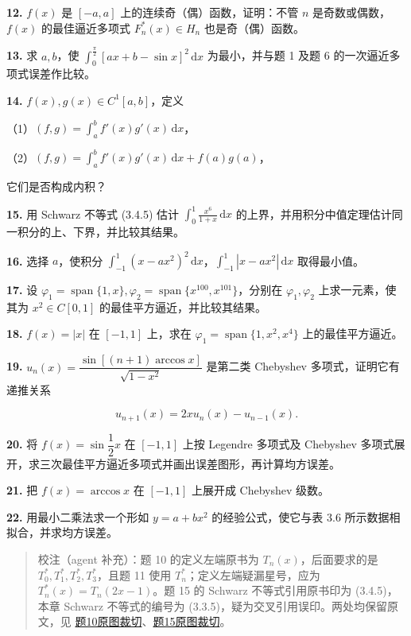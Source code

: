 \textbf{12.} \(f(x)\) 是 \([-a,a]\) 上的连续奇（偶）函数，证明：不管 \(n\) 是奇数或偶数，\(f(x)\) 的最佳逼近多项式 \(F_n^*(x)\in H_n\) 也是奇（偶）函数。

\textbf{13.} 求 \(a,b\)，使 \(\displaystyle\int_0^{\frac\pi2}[ax+b-\sin x]^2\,\mathrm dx\) 为最小，并与题 1 及题 6 的一次逼近多项式误差作比较。

\textbf{14.} \(f(x),g(x)\in C^1[a,b]\)，定义

（1）\((f,g)=\displaystyle\int_a^b f'(x)g'(x)\,\mathrm dx\)，

（2）\((f,g)=\displaystyle\int_a^b f'(x)g'(x)\,\mathrm dx+f(a)g(a)\)，

它们是否构成内积？

\textbf{15.} 用 Schwarz 不等式 (3.4.5) 估计 \(\displaystyle\int_0^1\frac{x^6}{1+x}\,\mathrm dx\) 的上界，并用积分中值定理估计同一积分的上、下界，并比较其结果。

\textbf{16.} 选择 \(a\)，使积分 \(\displaystyle\int_{-1}^1(x-ax^2)^2\,\mathrm dx\)，\(\displaystyle\int_{-1}^1|x-ax^2|\,\mathrm dx\) 取得最小值。

\textbf{17.} 设 \(\varphi_1=\operatorname{span}\{1,x\},\varphi_2=\operatorname{span}\{x^{100},x^{101}\}\)，分别在 \(\varphi_1,\varphi_2\) 上求一元素，使其为 \(x^2\in C[0,1]\) 的最佳平方逼近，并比较其结果。

\textbf{18.} \(f(x)=|x|\) 在 \([-1,1]\) 上，求在 \(\varphi_1=\operatorname{span}\{1,x^2,x^4\}\) 上的最佳平方逼近。

\textbf{19.} \(u_n(x)=\dfrac{\sin[(n+1)\arccos x]}{\sqrt{1-x^2}}\) 是第二类 Chebyshev 多项式，证明它有递推关系

\[
u_{n+1}(x)=2xu_n(x)-u_{n-1}(x).
\]

\textbf{20.} 将 \(f(x)=\sin\dfrac12x\) 在 \([-1,1]\) 上按 Legendre 多项式及 Chebyshev 多项式展开，求三次最佳平方逼近多项式并画出误差图形，再计算均方误差。

\textbf{21.} 把 \(f(x)=\arccos x\) 在 \([-1,1]\) 上展开成 Chebyshev 级数。

\textbf{22.} 用最小二乘法求一个形如 \(y=a+bx^2\) 的经验公式，使它与表 3.6 所示数据相拟合，并求均方误差。

\begin{quote}
校注（agent 补充）：题 10 的定义左端原书为 \(T_n(x)\)，后面要求的是 \(T_0^*,T_1^*,T_2^*,T_3^*\)，且题 11 使用 \(T_n^*\)；定义左端疑漏星号，应为 \(T_n^*(x)=T_n(2x-1)\)。题 15 的 Schwarz 不等式引用原书印为 (3.4.5)，本章 Schwarz 不等式的编号为 (3.3.5)，疑为交叉引用误印。两处均保留原文，见 \href{verified/assets/ch03b/p091-exercise-10.png}{题10原图裁切}、\href{verified/assets/ch03b/p091-exercise-15.png}{题15原图裁切}。
\end{quote}

